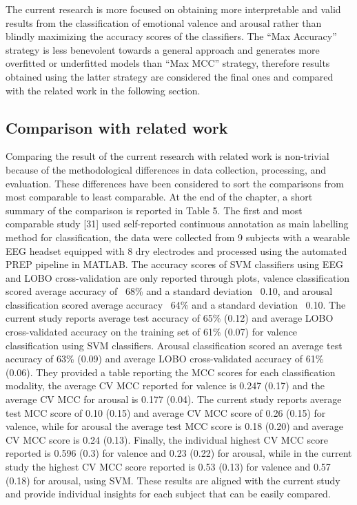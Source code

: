 The current research is more focused on obtaining more interpretable and valid results from the classification of emotional valence and arousal rather than blindly maximizing the accuracy scores of the classifiers. The “Max Accuracy” strategy is less benevolent towards a general approach and generates more overfitted or underfitted models than “Max MCC” strategy, therefore results obtained using the latter strategy are considered the final ones and compared with the related work in the following section.

\subsection{Comparison with related work}
Comparing the result of the current research with related work is non-trivial because of the methodological differences in data collection, processing, and evaluation. These differences have been considered to sort the comparisons from most comparable to least comparable. At the end of the chapter, a short summary of the comparison is reported in Table 5. 
The first and most comparable study [31] used self-reported continuous annotation as main labelling method for classification, the data were collected from 9 subjects with a wearable EEG headset equipped with 8 dry electrodes and processed using the automated PREP pipeline in MATLAB. The accuracy scores of SVM classifiers using EEG and LOBO cross-validation are only reported through plots, valence classification scored average accuracy of ~68\% and a standard deviation ~0.10, and arousal classification scored average accuracy ~64\% and a standard deviation ~0.10. The current study reports average test accuracy of 65\% (0.12) and average LOBO cross-validated accuracy on the training set of 61\% (0.07) for valence classification using SVM classifiers. Arousal classification scored an average test accuracy of 63\% (0.09) and average LOBO cross-validated accuracy of 61\% (0.06). They provided a table reporting the MCC scores for each classification modality, the average CV MCC reported for valence is 0.247 (0.17) and the average CV MCC for arousal is 0.177 (0.04). The current study reports average test MCC score of 0.10 (0.15) and average CV MCC score of 0.26 (0.15) for valence, while for arousal the average test MCC score is 0.18 (0.20) and average CV MCC score is 0.24 (0.13). Finally, the individual highest CV MCC score reported is 0.596 (0.3) for valence and 0.23 (0.22) for arousal, while in the current study the highest CV MCC score reported is 0.53 (0.13) for valence and 0.57 (0.18) for arousal, using SVM. These results are aligned with the current study and provide individual insights for each subject that can be easily compared.
